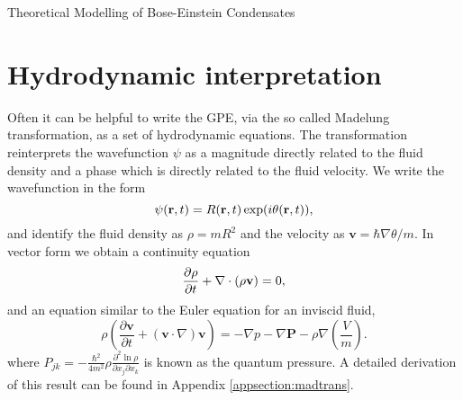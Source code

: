 \begin{chapter}{\label{cha:theoretical_model}Theoretical Modelling of Bose-Einstein Condensates}
\section{\label{section:hydrodynamic} Hydrodynamic interpretation}
	Often it can be helpful to write the GPE, via the so called Madelung transformation, as a set of hydrodynamic equations. The transformation reinterprets the wavefunction $\psi$ as a magnitude directly related to the fluid density and a phase which is directly related to the fluid velocity. We write the wavefunction in the form
	\begin{equation}
		\psi({\bf r},t) = R({\bf r},t)\exp (i\theta({\bf r},t)),
	\end{equation}
	 and identify the fluid density as $\rho=mR^2$ and the velocity as $\mathbf{v} = \hbar\nabla\theta/m $.
	In vector form we obtain a continuity equation
	\begin{equation}
	  \frac{\partial \rho}{\partial t} + \nabla\cdot(\rho{\bf v}) = 0,
	  \label{eq:MTcont}
	\end{equation}
	and an equation similar to the Euler equation for an inviscid fluid,
	\begin{equation}
	\rho\left( \frac{\partial \mathbf{v}}{\partial t} + \left( \mathbf{v} \cdot \nabla \right)\mathbf{v} \right) = -\nabla p - \nabla \mathbf{P} - \rho \nabla \left(\frac{V}{m}\right).
	\end{equation}
	where $P_{jk} = -\frac{\hbar^2}{4m^2}\rho\frac{\partial^2\ln{\rho}}{\partial x_j \partial x_k}$ is known as the quantum pressure.
	A detailed derivation of this result can be found in Appendix \ref{appsection:madtrans}.


\end{chapter}

